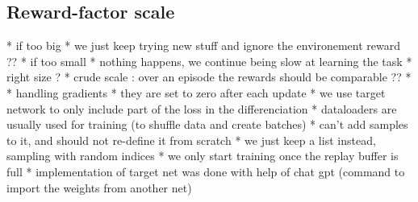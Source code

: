 \documentclass[a4paper, 12pt,oneside]{article}
\begin{document}
            \subsection{Reward-factor scale}
            * if too big
            * we just keep trying new stuff and ignore the environement reward ??  
            * if too small
            * nothing happens, we continue being slow at learning the task
            * right size ?
            * crude scale : over an episode the rewards should be comparable ?? 
            * 
            * handling gradients 
            * they are set to zero after each update
            * we use target network to only include part of the loss in the differenciation 
          * dataloaders are usually used for training (to shuffle data and create batches)
            * can't add samples to it, and should not re-define it from scratch 
              * we just keep a list instead, sampling with random indices 
          * we only start training once the replay buffer is full 
          * implementation of target net was done with help of chat gpt (command to import the weights from another net)
\end{document}
